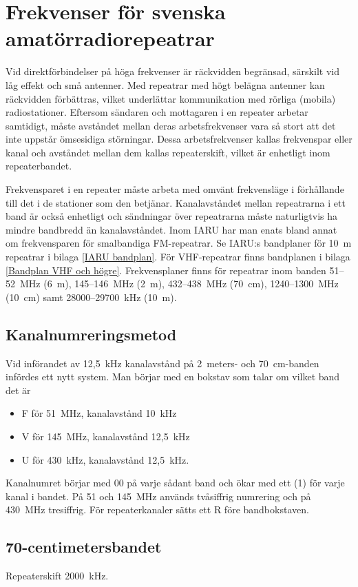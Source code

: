 \chapter[Svenska repeatrar]{Frekvenser för svenska amatörradiorepeatrar}
\label{svenska repeatrar}

Vid direktförbindelser på höga frekvenser är räckvidden begränsad,
särskilt vid låg effekt och små antenner.
Med repeatrar med högt belägna antenner kan räckvidden förbättras,
vilket underlättar kommunikation med rörliga (mobila) radiostationer.
Eftersom sändaren och mottagaren i en repeater arbetar samtidigt, måste
avståndet mellan deras arbetsfrekvenser vara så stort att det inte uppstår
ömsesidiga störningar.
Dessa arbetsfrekvenser kallas frekvenspar eller kanal och avståndet mellan dem
kallas repeaterskift, vilket är enhetligt inom repeaterbandet.

Frekvensparet i en repeater måste arbeta med omvänt frekvensläge i förhållande
till det i de stationer som den betjänar.
Kanalavståndet mellan repeatrarna i ett band är också enhetligt och sändningar
över repeatrarna måste naturligtvis ha mindre bandbredd än kanalavståndet.
Inom IARU har man enats bland annat om frekvensparen för smalbandiga
FM-repeatrar.
Se IARU:s bandplaner för 10~m repeatrar i bilaga \ref{IARU bandplan}.
För VHF-repeatrar finns bandplanen i bilaga \ref{Bandplan VHF och högre}.
Frekvensplaner finns för repeatrar inom banden 51--52~MHz (6~m), 145--146~MHz
(2~m), 432--438~MHz (70~cm), 1240--1300~MHz (10~cm) samt 28000--29700~kHz (10~m).

\section{Kanalnumreringsmetod}
Vid införandet av 12,5~kHz kanalavstånd på 2~meters- och 70~cm-banden infördes
ett nytt system.
Man börjar med en bokstav som talar om vilket band det är
\begin{itemize}
  \item F för 51~MHz, kanalavstånd 10~kHz
  \item V för 145~MHz, kanalavstånd 12,5~kHz
  \item U för 430~kHz, kanalavstånd 12,5~kHz.
\end{itemize}
Kanalnumret börjar med 00 på varje sådant band och ökar med ett (1) för varje
kanal i bandet.
På 51 och 145~MHz används tvåsiffrig numrering och på 430~MHz tresiffrig.
För repeaterkanaler sätts ett R före bandbokstaven.

\section{70-centimetersbandet}
Repeaterskift 2000~kHz.

